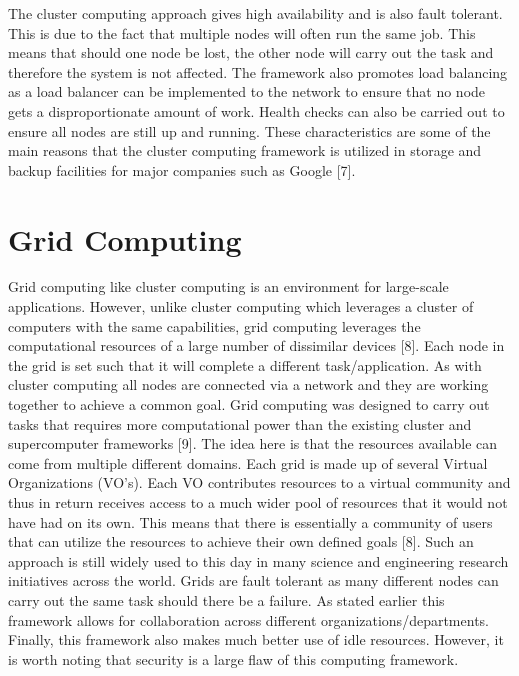 \documentclass[oneside,12pt]{Classes/RoboticsLaTeX}
\begin{document}
The cluster computing approach gives high availability and is also fault tolerant. This is due to the fact that multiple nodes will often run the same job. This means that should one node be lost, the other node will carry out the task and therefore the system is not affected. The framework also promotes load balancing as a load balancer can be implemented to the network to ensure that no node gets a disproportionate amount of work. Health checks can also be carried out to ensure all nodes are still up and running. These characteristics are some of the main reasons that the cluster computing framework is utilized in storage and backup facilities for major companies such as Google [7].

\section{Grid Computing}
Grid computing like cluster computing is an environment for large-scale applications. However, unlike cluster computing which leverages a cluster of computers with the same capabilities, grid computing leverages the computational resources of a large number of dissimilar devices [8]. Each node in the grid is set such that it will complete a different task/application. As with cluster computing all nodes are connected via a network and they are working together to achieve a common goal. Grid computing was designed to carry out tasks that requires more computational power than the existing cluster and supercomputer frameworks [9]. The idea here is that the resources available can come from multiple different domains. Each grid is made up of several Virtual Organizations (VO's). Each VO contributes resources to a virtual community and thus in return receives access to a much wider pool of resources that it would not have had on its own. This means that there is essentially a community of users that can utilize the resources to achieve their own defined goals [8]. Such an approach is still widely used to this day in many science and engineering research initiatives across the world. Grids are fault tolerant as many different nodes can carry out the same task should there be a failure. As stated earlier this framework allows for collaboration across different organizations/departments. Finally, this framework also makes much better use of idle resources. However, it is worth noting that security is a large flaw of this computing framework.  
\end{document}
